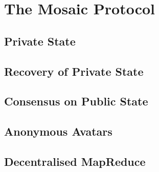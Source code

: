 \documentclass[twoside,twocolumn]{article}
\begin{document}

\section{The Mosaic Protocol}

\subsection{Private State}

\subsection{Recovery of Private State}

\subsection{Consensus on Public State}

\subsection{Anonymous Avatars}

\subsection{Decentralised MapReduce}



\theendnotes


\begin{thebibliography}{99} %

 
\end{thebibliography}

\end{document}
